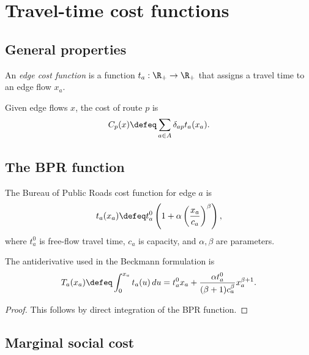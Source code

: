 
\section{Travel-time cost functions}

\subsection{General properties}


\begin{definition}
An \emph{edge cost function} is a function $t_a : \R_+ \to \R_+$ that assigns a travel time to an edge flow $x_a$.
\end{definition}

\begin{definition}
Given edge flows $x$, the cost of route $p$ is
\[
C_p(x) \defeq \sum_{a \in A} \delta_{ap} t_a(x_a).
\]
\end{definition}

\subsection{The BPR function}

\begin{definition}
The Bureau of Public Roads cost function for edge $a$ is
\[
t_a(x_a) \defeq t_a^0 \left(1 + \alpha \left(\frac{x_a}{c_a}\right)^\beta \right),
\]
where $t_a^0$ is free-flow travel time, $c_a$ is capacity, and $\alpha,\beta$ are parameters.
\end{definition}

\begin{proposition}\label{prop:bpr_integral}
The antiderivative used in the Beckmann formulation is
\[
T_a(x_a) \defeq \int_0^{x_a} t_a(u) \, du
= t_a^0 x_a + \frac{\alpha t_a^0}{(\beta+1)c_a^\beta}x_a^{\beta+1}.
\]
\end{proposition}

\begin{proof}
This follows by direct integration of the BPR function.
\end{proof}

\subsection{Marginal social cost}

